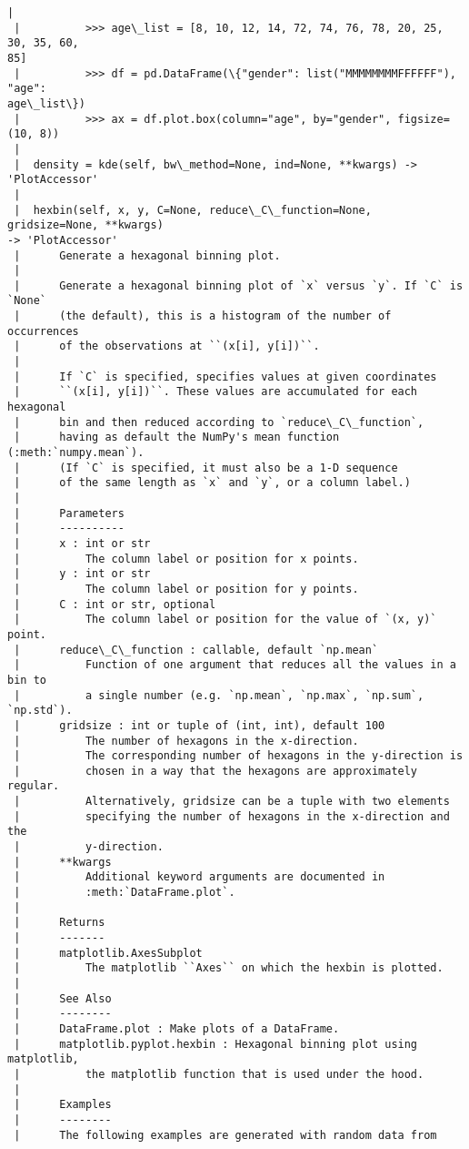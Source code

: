 \documentclass[11pt]{article}
\begin{document}
\begin{Verbatim}[commandchars=\\\{\}]
 |
 |          >>> age\_list = [8, 10, 12, 14, 72, 74, 76, 78, 20, 25, 30, 35, 60,
85]
 |          >>> df = pd.DataFrame(\{"gender": list("MMMMMMMMFFFFFF"), "age":
age\_list\})
 |          >>> ax = df.plot.box(column="age", by="gender", figsize=(10, 8))
 |
 |  density = kde(self, bw\_method=None, ind=None, **kwargs) -> 'PlotAccessor'
 |
 |  hexbin(self, x, y, C=None, reduce\_C\_function=None, gridsize=None, **kwargs)
-> 'PlotAccessor'
 |      Generate a hexagonal binning plot.
 |
 |      Generate a hexagonal binning plot of `x` versus `y`. If `C` is `None`
 |      (the default), this is a histogram of the number of occurrences
 |      of the observations at ``(x[i], y[i])``.
 |
 |      If `C` is specified, specifies values at given coordinates
 |      ``(x[i], y[i])``. These values are accumulated for each hexagonal
 |      bin and then reduced according to `reduce\_C\_function`,
 |      having as default the NumPy's mean function (:meth:`numpy.mean`).
 |      (If `C` is specified, it must also be a 1-D sequence
 |      of the same length as `x` and `y`, or a column label.)
 |
 |      Parameters
 |      ----------
 |      x : int or str
 |          The column label or position for x points.
 |      y : int or str
 |          The column label or position for y points.
 |      C : int or str, optional
 |          The column label or position for the value of `(x, y)` point.
 |      reduce\_C\_function : callable, default `np.mean`
 |          Function of one argument that reduces all the values in a bin to
 |          a single number (e.g. `np.mean`, `np.max`, `np.sum`, `np.std`).
 |      gridsize : int or tuple of (int, int), default 100
 |          The number of hexagons in the x-direction.
 |          The corresponding number of hexagons in the y-direction is
 |          chosen in a way that the hexagons are approximately regular.
 |          Alternatively, gridsize can be a tuple with two elements
 |          specifying the number of hexagons in the x-direction and the
 |          y-direction.
 |      **kwargs
 |          Additional keyword arguments are documented in
 |          :meth:`DataFrame.plot`.
 |
 |      Returns
 |      -------
 |      matplotlib.AxesSubplot
 |          The matplotlib ``Axes`` on which the hexbin is plotted.
 |
 |      See Also
 |      --------
 |      DataFrame.plot : Make plots of a DataFrame.
 |      matplotlib.pyplot.hexbin : Hexagonal binning plot using matplotlib,
 |          the matplotlib function that is used under the hood.
 |
 |      Examples
 |      --------
 |      The following examples are generated with random data from

\end{Verbatim}
\end{document}
